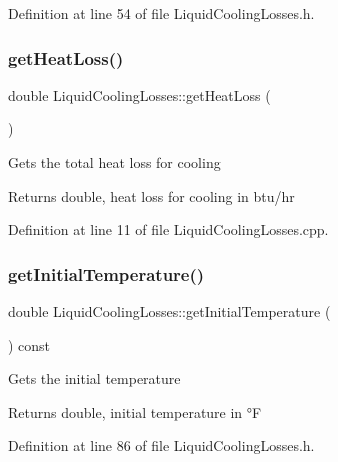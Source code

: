 Definition at line 54 of file Liquid\+Cooling\+Losses.\+h.

\mbox{\label{class_liquid_cooling_losses_a6a131f8f3141edef7f29df4455c6aee5}} 
\subsubsection{\texorpdfstring{get\+Heat\+Loss()}{getHeatLoss()}}
{\footnotesize\ttfamily double Liquid\+Cooling\+Losses\+::get\+Heat\+Loss (\begin{DoxyParamCaption}{ }\end{DoxyParamCaption})}

Gets the total heat loss for cooling \begin{DoxyReturn}{Returns}
double, heat loss for cooling in btu/hr 
\end{DoxyReturn}


Definition at line 11 of file Liquid\+Cooling\+Losses.\+cpp.

\mbox{\label{class_liquid_cooling_losses_a4cfb23800b80e99858bbc5c3ef5169eb}} 
\subsubsection{\texorpdfstring{get\+Initial\+Temperature()}{getInitialTemperature()}}
{\footnotesize\ttfamily double Liquid\+Cooling\+Losses\+::get\+Initial\+Temperature (\begin{DoxyParamCaption}{ }\end{DoxyParamCaption}) const\hspace{0.3cm}{\ttfamily [inline]}}

Gets the initial temperature \begin{DoxyReturn}{Returns}
double, initial temperature in °F 
\end{DoxyReturn}


Definition at line 86 of file Liquid\+Cooling\+Losses.\+h.

\mbox{\label{class_liquid_cooling_losses_ae6364da9b374e95dd657096350464acb}} 
